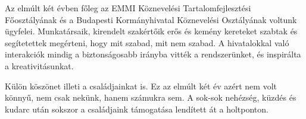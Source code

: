 Az elmúlt két évben főleg az EMMI Köznevelési Tartalomfejlesztési Főosztályának és a Budapesti Kormányhivatal Köznevelési Osztályának voltunk ügyfelei. Munkatársaik, kirendelt szakértőik erős és kemény kereteket szabtak és segítetettek megérteni, hogy mit szabad, mit nem szabad. A hivatalokkal való interakciók mindig a biztonságosabb irányba vitték a rendszerünket, és inspirálta a kreativitásunkat. 
 
Külön köszönet illeti a családjainkat is. Ez az elmúlt két év azért nem volt könnyű, nem csak nekünk, hanem számukra sem. A sok-sok nehézség, küzdés és kudarc után sokszor a családjaink támogatása lendített át a holtponton. 
